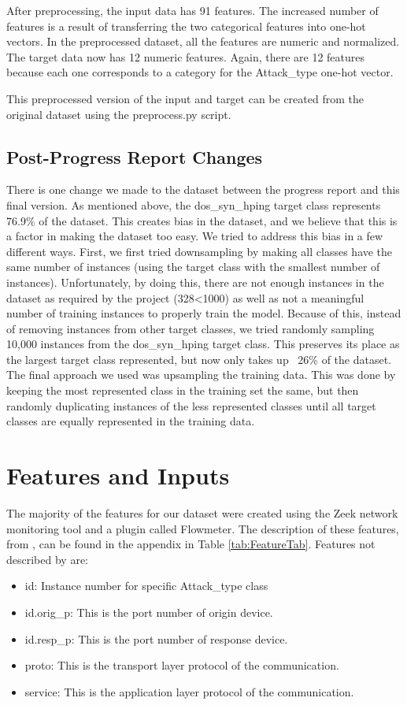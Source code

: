 \documentclass[11pt]{article}
\begin{document}
After preprocessing, the input data has 91 features. The increased number of features is a result of transferring the two categorical features into one-hot vectors. In the preprocessed dataset, all the features are numeric and normalized. The target data now has 12 numeric features. Again, there are 12 features because each one corresponds to a category for the Attack\_type one-hot vector.

This preprocessed version of the input and target can be created from the original dataset using the preprocess.py script.

\subsection{Post-Progress Report Changes}
\label{sec:Post-Progress Report Changes}

There is one change we made to the dataset between the progress report and this final version. As mentioned above, the dos\_syn\_hping target class represents 76.9\% of the dataset. This creates bias in the dataset, and we believe that this is a factor in making the dataset too easy. We tried to address this bias in a few different ways. First, we first tried downsampling by making all classes have the same number of instances (using the target class with the smallest number of instances). Unfortunately, by doing this, there are not enough instances in the dataset as required by the project (328<1000) as well as not a meaningful number of training instances to properly train the model. Because of this, instead of removing instances from other target classes, we tried randomly sampling 10,000 instances from the dos\_syn\_hping target class. This preserves its place as the largest target class represented, but now only takes up ~26\% of the dataset. The final approach we used was upsampling the training data. This was done by keeping the most represented class in the training set the same, but then randomly duplicating instances of the less represented classes until all target classes are equally represented in the training data.

\section{Features and Inputs}
\label{sec:Features}

The majority of the features for our dataset were created using the Zeek network monitoring tool and a plugin called Flowmeter. The description of these features, from \citep{ref12}, can be found in the appendix in Table \ref{tab:FeatureTab}. Features not described by \citep{ref12} are:
\begin{itemize}
  \item id: Instance number for specific Attack\_type class
  \item id.orig\_p: This is the port number of origin device.
  \item id.resp\_p: This is the port number of response device.
  \item proto: This is the transport layer protocol of the communication.
  \item service: This is the application layer protocol of the communication.
\end{itemize}
\end{document}
